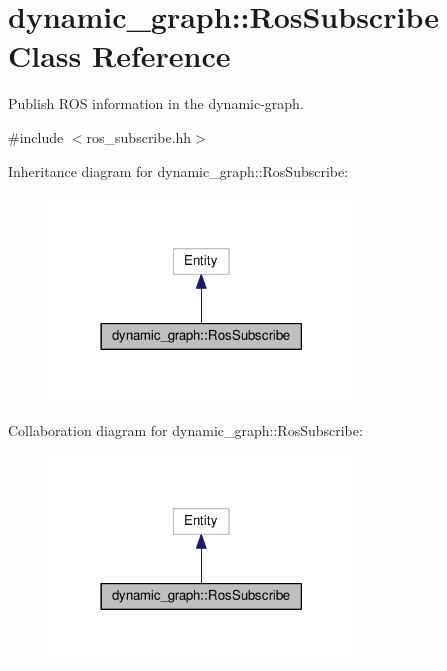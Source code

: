 \hypertarget{classdynamic__graph_1_1RosSubscribe}{}\section{dynamic\+\_\+graph\+:\+:Ros\+Subscribe Class Reference}
\label{classdynamic__graph_1_1RosSubscribe}


Publish R\+OS information in the dynamic-\/graph.  




{\ttfamily \#include $<$ros\+\_\+subscribe.\+hh$>$}



Inheritance diagram for dynamic\+\_\+graph\+:\+:Ros\+Subscribe\+:\nopagebreak
\begin{figure}[H]
\begin{center}
\leavevmode
\includegraphics[width=230pt]{classdynamic__graph_1_1RosSubscribe__inherit__graph}
\end{center}
\end{figure}


Collaboration diagram for dynamic\+\_\+graph\+:\+:Ros\+Subscribe\+:\nopagebreak
\begin{figure}[H]
\begin{center}
\leavevmode
\includegraphics[width=230pt]{classdynamic__graph_1_1RosSubscribe__coll__graph}
\end{center}
\end{figure}
